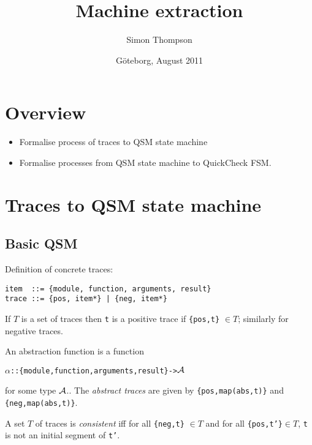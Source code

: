 \documentclass[12pt]{article}
\begin{document}
\title{Machine extraction}
\author{Simon Thompson}
\date{G\"{o}teborg, August 2011}
\maketitle

\section{Overview}

\begin{itemize}
\item Formalise process of traces to QSM state machine
\item Formalise processes from QSM state machine to QuickCheck FSM.
\end{itemize}


\section{Traces to QSM state machine}

\subsection{Basic QSM}

Definition of concrete traces:
\begin{verbatim}
item  ::= {module, function, arguments, result}
trace ::= {pos, item*} | {neg, item*}
\end{verbatim}
If $T$ is a set of traces then \texttt{t} is a positive trace if \texttt{\{pos,t\}}
\ensuremath{\in T}; similarly for negative traces.

An abstraction function is a function 
\begin{alltt}
\ensuremath{\alpha} :: \{module, function, arguments, result\} -> \ensuremath{\cal{A}}
\end{alltt}
for some type $\cal{A}$.. The \emph{abstract traces} are given by \texttt{\{pos,map(abs,t)\}} and \texttt{\{neg,map(abs,t)\}}.

A set $T$ of traces is \emph{consistent} iff for all \texttt{\{neg,t\}} \ensuremath{\in T} and for all \texttt{\{pos,t'\}}\ensuremath{\in T}, \texttt{t} is not an initial segment of \texttt{t'}. 
\end{document}
